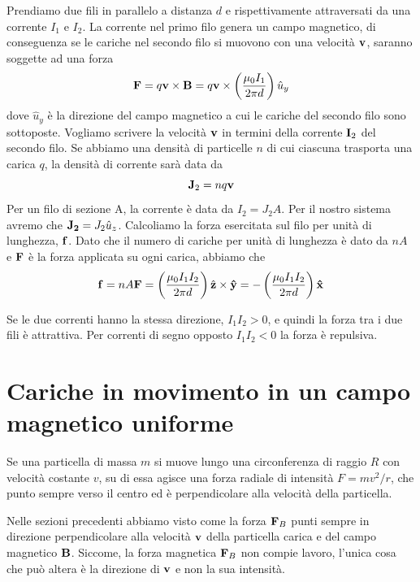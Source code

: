 \noindent Prendiamo due fili in parallelo a distanza $d$ e rispettivamente attraversati da una corrente $I_1$ e $I_2$. La corrente nel primo filo genera un campo magnetico, di conseguenza se le cariche nel secondo filo si muovono con una velocit\`a $\bold{v}$, saranno soggette ad una forza 
\begin{equation*}
	\bold{F} = q \bold{v} \times \bold{B} = q \bold{v} \times \left ( \frac{\mu_0I_1}{2 \pi d}\right)\hat{u}_y
\end{equation*} 
dove $\hat{u}_y$ \`e la direzione del campo magnetico a cui le cariche del secondo filo sono sottoposte. Vogliamo scrivere la velocit\`a $\bold{v}$ in termini della corrente $\bold{I}_2$ del secondo filo. Se abbiamo una densit\`a di particelle $n$ di cui ciascuna trasporta una carica $q$, la densit\`a di corrente sar\`a data da
\begin{equation*}
	\bold{J}_2 = nq \bold{v}
\end{equation*}
Per un filo di sezione A, la corrente \`e data da $I_2 = J_2A$. Per il nostro sistema avremo che $\bold{J_2} = J_2 \hat{u}_{z}$. Calcoliamo la forza esercitata sul filo per unit\`a di lunghezza, $\bold{f}$. Dato che il numero di cariche per unit\`a di lunghezza \`e dato da $nA$ e $\bold{F}$ \`e la forza applicata su ogni carica, abbiamo che
\begin{equation}
	\bold{f} =nA\bold{F} = \left ( \frac{\mu_0 I_1 I_2}{2 \pi d}\right)\hat{\bold{z}} \times \bold{\hat{y}} = - \left ( \frac{\mu_0 I_1 I_2}{2 \pi d}\right) \bold{\hat{x}}
\end{equation}

Se le due correnti hanno la stessa direzione, $I_1 I_2 > 0$,  e quindi la forza tra i due fili \`e attrattiva. Per correnti di segno opposto $I_1 I_2 < 0$ la forza \`e repulsiva.

\section{Cariche in movimento in un campo magnetico uniforme}

Se una particella di massa $m$ si muove lungo una circonferenza di raggio $R$ con velocit\`a costante $v$, su di essa agisce una forza radiale di intensit\`a $F = mv^2/r$, che punto sempre verso il centro ed \`e perpendicolare alla velocit\`a della particella.
\newline

\noindent Nelle sezioni precedenti abbiamo visto come la forza $\bold{F}_{B}$ punti sempre in direzione perpendicolare alla velocit\`a $\bold{v}$ della particella carica e del campo magnetico $\bold{B}$. Siccome, la forza magnetica $\bold{F}_B$ non compie lavoro, l'unica cosa che pu\`o altera \`e la direzione di $\bold{v}$ e non la sua intensit\`a.

